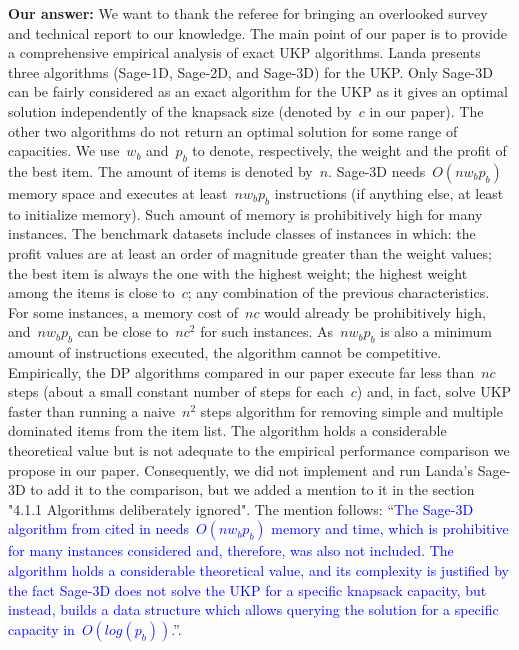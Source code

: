 \documentclass{elsarticle}
\begin{document}
\textbf{Our answer:}
We want to thank the referee for bringing an overlooked survey and technical report to our knowledge.
The main point of our paper is to provide a comprehensive empirical analysis of exact UKP algorithms.
Landa presents three algorithms (Sage-1D, Sage-2D, and Sage-3D) for the UKP.
Only Sage-3D can be fairly considered as an exact algorithm for the UKP as it gives an optimal solution independently of the knapsack size (denoted by~\(c\) in our paper).
The other two algorithms do not return an optimal solution for some range of capacities.
We use~\(w_b\) and~\(p_b\) to denote, respectively, the weight and the profit of the best item.
The amount of items is denoted by~\(n\).
Sage-3D needs~\(O(n w_b p_b)\) memory space and executes at least~\(n w_b p_b\) instructions (if anything else, at least to initialize memory).
Such amount of memory is prohibitively high for many instances.
The benchmark datasets include classes of instances in which: the profit values are at least an order of magnitude greater than the weight values; the best item is always the one with the highest weight; the highest weight among the items is close to~\(c\); any combination of the previous characteristics.
For some instances, a memory cost of~\(nc\) would already be prohibitively high, and~\(n w_b p_b\) can be close to~\(n c^2\) for such instances.
As~\(n w_b p_b\) is also a minimum amount of instructions executed, the algorithm cannot be competitive.
Empirically, the DP algorithms compared in our paper execute far less than~\(nc\) steps (about a small constant number of steps for each~\(c\)) and, in fact, solve UKP faster than running a naive~\(n^2\) steps algorithm for removing simple and multiple dominated items from the item list.
The algorithm holds a considerable theoretical value but is not adequate to the empirical performance comparison we propose in our paper.
Consequently, we did not implement and run Landa's Sage-3D to add it to the comparison, but we added a mention to it in the section "4.1.1 Algorithms deliberately ignored".
The mention follows: ``\textcolor{blue}{The Sage-3D algorithm from \cite{landa_sage} cited in \cite{ukp_hu_landa_shing_survey} needs~\(O(n w_b p_b)\) memory and time, which is prohibitive for many instances considered and, therefore, was also not included.
The algorithm holds a considerable theoretical value, and its complexity is justified by the fact Sage-3D does not solve the UKP for a specific knapsack capacity, but instead, builds a data structure which allows querying the solution for a specific capacity in~\(O(log(p_b))\).}''.
\bigskip
\end{document}

